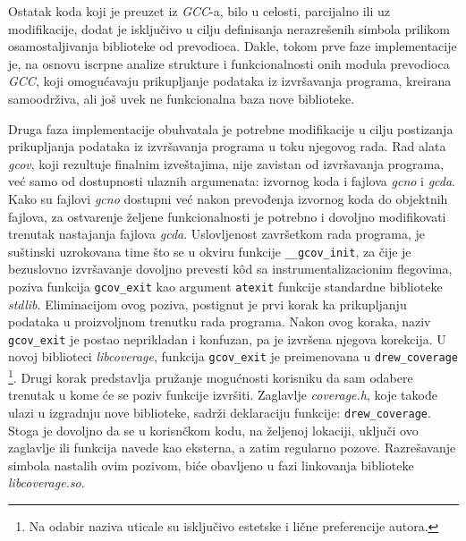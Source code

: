 \documentclass[12pt,oneside]{memoir}
\newcommand{\kod}[1]{\texttt{#1}}
\newcommand{\strano}[1]{\textit{#1}}
\begin{document}
Ostatak koda koji je preuzet iz \strano{GCC}-a, bilo u celosti, parcijalno ili uz modifikacije, dodat je isključivo u cilju definisanja nerazrešenih simbola prilikom osamostaljivanja biblioteke od prevodioca. Dakle, tokom prve faze implementacije je, na osnovu iscrpne analize strukture i funkcionalnosti onih modula prevodioca \strano{GCC}, koji omogućavaju prikupljanje podataka iz izvršavanja programa, kreirana samoodrživa, ali još uvek ne funkcionalna baza nove biblioteke. 

Druga faza implementacije obuhvatala je potrebne modifikacije u cilju postizanja prikupljanja podataka iz izvršavanja programa u toku njegovog rada. Rad alata \strano{gcov}, koji rezultuje finalnim izveštajima, nije zavistan od izvršavanja programa, već samo od dostupnosti ulaznih argumenata: izvornog koda i fajlova \strano{gcno} i \strano{gcda}. Kako su fajlovi \strano{gcno} dostupni već nakon prevođenja izvornog koda do objektnih fajlova, za ostvarenje željene funkcionalnosti je potrebno i dovoljno modifikovati trenutak nastajanja fajlova \strano{gcda}. Uslovljenost završetkom rada programa, je suštinski uzrokovana time što se u okviru funkcije \kod{\_\_gcov\_init}, za čije je bezuslovno izvršavanje dovoljno prevesti k\^{o}d sa instrumentalizacionim flegovima, poziva funkcija \kod{gcov\_exit} kao argument \kod{atexit} funkcije standardne biblioteke \strano{stdlib}. Eliminacijom ovog poziva, postignut je prvi korak ka prikupljanju podataka u proizvoljnom trenutku rada programa. Nakon ovog koraka, naziv \kod{gcov\_exit} je postao neprikladan i konfuzan, pa je izvršena njegova korekcija. U novoj biblioteci \strano{libcoverage}, funkcija \kod{gcov\_exit} je preimenovana u \kod{drew\_coverage} \footnote{Na odabir naziva uticale su isključivo estetske i lične preferencije autora.}. Drugi korak predstavlja pružanje mogućnosti korisniku da sam odabere trenutak u kome će se poziv funkcije izvršiti. Zaglavlje \strano{coverage.h}, koje takođe ulazi u izgradnju nove biblioteke, sadrži deklaraciju funkcije: \kod{drew\_coverage}. Stoga je dovoljno da se u korisnčkom kodu, na željenoj lokaciji, uključi ovo zaglavlje ili funkcija navede kao eksterna, a zatim regularno pozove. Razrešavanje simbola nastalih ovim pozivom, biće obavljeno u fazi linkovanja biblioteke \strano{libcoverage.so}.
\end{document}
